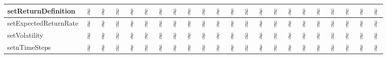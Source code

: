 \documentclass[10pt]{article}
\begin{document}
\begin{longtable}{|l|l|l|l|l|l|l|l|l|l|l|l|l|l|l|l|l|l|l|l|l|l|}
\hline
setReturnDefinition&{\color{BrickRed}$\nparallel$}&{\color{BrickRed}$\nparallel$}&{\color{BrickRed}$\nparallel$}&{\color{BrickRed}$\nparallel$}&{\color{BrickRed}$\nparallel$}&{\color{BrickRed}$\nparallel$}&{\color{BrickRed}$\nparallel$}&{\color{BrickRed}$\nparallel$}&{\color{BrickRed}$\nparallel$}&{\color{BrickRed}$\nparallel$}&{\color{BrickRed}$\nparallel$}&{\color{BrickRed}$\nparallel$}&{\color{BrickRed}$\nparallel$}&{\color{BrickRed}$\nparallel$}&{\color{BrickRed}$\nparallel$}&{\color{BrickRed}$\nparallel$}&{\color{BrickRed}$\nparallel$}&{\color{BrickRed}$\nparallel$}&{\color{BrickRed}$\nparallel$}&{\color{BrickRed}$\nparallel$}&{\color{BrickRed}$\nparallel$}\\
\hline
setExpectedReturnRate&{\color{BrickRed}$\nparallel$}&{\color{BrickRed}$\nparallel$}&{\color{BrickRed}$\nparallel$}&{\color{BrickRed}$\nparallel$}&{\color{BrickRed}$\nparallel$}&{\color{BrickRed}$\nparallel$}&{\color{BrickRed}$\nparallel$}&{\color{BrickRed}$\nparallel$}&{\color{BrickRed}$\nparallel$}&{\color{BrickRed}$\nparallel$}&{\color{BrickRed}$\nparallel$}&{\color{BrickRed}$\nparallel$}&{\color{BrickRed}$\nparallel$}&{\color{BrickRed}$\nparallel$}&{\color{BrickRed}$\nparallel$}&{\color{BrickRed}$\nparallel$}&{\color{BrickRed}$\nparallel$}&{\color{BrickRed}$\nparallel$}&{\color{BrickRed}$\nparallel$}&{\color{BrickRed}$\nparallel$}&{\color{BrickRed}$\nparallel$}\\
\hline
setVolatility&{\color{BrickRed}$\nparallel$}&{\color{BrickRed}$\nparallel$}&{\color{BrickRed}$\nparallel$}&{\color{BrickRed}$\nparallel$}&{\color{BrickRed}$\nparallel$}&{\color{BrickRed}$\nparallel$}&{\color{BrickRed}$\nparallel$}&{\color{BrickRed}$\nparallel$}&{\color{BrickRed}$\nparallel$}&{\color{BrickRed}$\nparallel$}&{\color{BrickRed}$\nparallel$}&{\color{BrickRed}$\nparallel$}&{\color{BrickRed}$\nparallel$}&{\color{BrickRed}$\nparallel$}&{\color{BrickRed}$\nparallel$}&{\color{BrickRed}$\nparallel$}&{\color{BrickRed}$\nparallel$}&{\color{BrickRed}$\nparallel$}&{\color{BrickRed}$\nparallel$}&{\color{BrickRed}$\nparallel$}&{\color{BrickRed}$\nparallel$}\\
\hline
setnTimeSteps&{\color{BrickRed}$\nparallel$}&{\color{BrickRed}$\nparallel$}&{\color{BrickRed}$\nparallel$}&{\color{BrickRed}$\nparallel$}&{\color{BrickRed}$\nparallel$}&{\color{BrickRed}$\nparallel$}&{\color{BrickRed}$\nparallel$}&{\color{BrickRed}$\nparallel$}&{\color{BrickRed}$\nparallel$}&{\color{BrickRed}$\nparallel$}&{\color{BrickRed}$\nparallel$}&{\color{BrickRed}$\nparallel$}&{\color{BrickRed}$\nparallel$}&{\color{BrickRed}$\nparallel$}&{\color{BrickRed}$\nparallel$}&{\color{BrickRed}$\nparallel$}&{\color{BrickRed}$\nparallel$}&{\color{BrickRed}$\nparallel$}&{\color{BrickRed}$\nparallel$}&{\color{BrickRed}$\nparallel$}&{\color{BrickRed}$\nparallel$}\\

\end{longtable}
\end{document}
